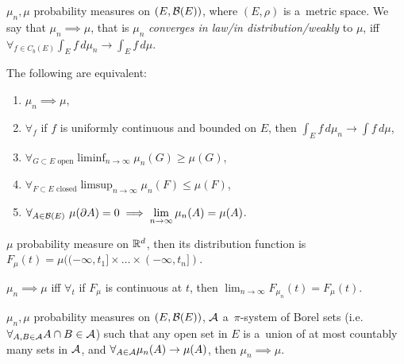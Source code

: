 



	\begin{definition}
		$\mu_n, \mu$ probability measures on $(E, \mathcal{B}(E))$, where $(E, \rho)$ is a~metric space. We say that $\mu_n \implies \mu$, that is $\mu_n$ \emph{converges in law/in distribution/weakly} to $\mu$, iff $\displaystyle\forall_{f \in C_b(E)} \int_E f\,d\mu_n \to \int_E f\,d\mu$.
	\end{definition}
	
	\begin{theorem}
		The following are equivalent:
		\begin{enumerate}
			\item $\mu_n \implies \mu$,
			\item $\forall_f$ if $f$ is uniformly continuous and bounded on $E$, then $\displaystyle\int_E f\,d\mu_n \to \int f\,d\mu$,
			\item $\displaystyle\forall_{G \subset E\text{ open}} \liminf_{n \to \infty} \mu_n(G) \geq \mu(G)$,
			\item $\displaystyle\forall_{F \subset E\text{ closed}} \limsup_{n \to \infty} \mu_n(F) \leq \mu(F)$,
			\item $\displaystyle\forall_{A \in \B(E)}\ \mu(\partial A) = 0 \implies \lim_{n \to \infty} \mu_n(A) = \mu(A)$.
		\end{enumerate}
	\end{theorem}
	
	\begin{definition}
		$\mu$ probability measure on $\mathbb{R}^d$, then its distribution function is $F_\mu(t) = \mu( (-\infty, t_1] \times \ldots \times (-\infty, t_n] )$.
	\end{definition}
	
	\begin{theorem}
		$\mu_n \implies \mu$ iff $\forall_t$ if $F_\mu$ is continuous at $t$, then $\displaystyle\lim_{n \to \infty} F_{\mu_n}(t) = F_\mu(t)$.
	\end{theorem}
	
	\begin{lemma}
		$\mu_n, \mu$ probability measures on $(E, \mathcal{B}(E))$, ${\mathcal{A}}$ a~$\pi$-system of Borel sets (i.e. $\forall_{A, B \in {\mathcal{A}}} A \cap B \in {\mathcal{A}}$) such that any open set in $E$ is a~union of at most countably many sets in ${\mathcal{A}}$, and $\forall_{A \in {\mathcal{A}}} \mu_n(A) \to \mu(A)$, then $\mu_n \implies \mu$.
	\end{lemma}
	
